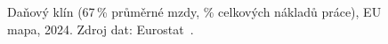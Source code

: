 \def\strEuDanovyKlinTitle{Daňový klín (67\,\% průměrné mzdy, 2024)}%
\def\strEuDanovyKlinColorbarLabel{daňový klín [\% mzdových nákladů]}%
\def\strEuDanovyKlinCaption{\centering Daňový klín (67\,\% průměrné mzdy, \% celkových nákladů práce), EU mapa, 2024. Zdroj dat: Eurostat~\cite{eurostat_earn_nt_taxwedge_PC_AW100}.}%
%
\begin{figure}[htbp]
  \centering
  \resizebox{0.92\linewidth}{!}{}
  \caption{\strEuDanovyKlinCaption}
  \label{fig:eu_danovy_klin}
\end{figure}
